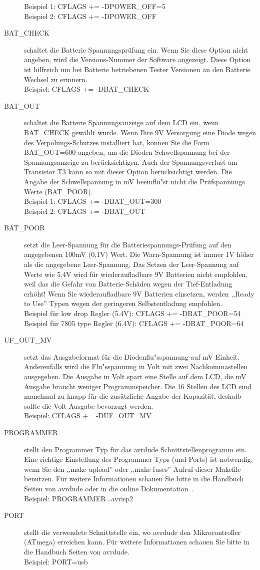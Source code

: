 \begin{description}
Beispiel 1: CFLAGS += -DPOWER\_OFF=5 \\
Beispiel 2: CFLAGS += -DPOWER\_OFF 
  \item[BAT\_CHECK] schaltet die Batterie Spannungspr\"ufung ein.
 Wenn Sie diese Option nicht angeben, wird die Versions-Nummer der Software angezeigt.
Diese Option ist hilfreich um bei Batterie betriebenen Tester Versionen an den Batterie Wechsel zu erinnern.\\
Beispiel: CFLAGS += -DBAT\_CHECK
  \item[BAT\_OUT] schaltet die Batterie Spannungsanzeige auf dem LCD ein, wenn BAT\_CHECK gew\"ahlt wurde.
 Wenn Ihre 9V Versorgung eine Diode wegen des Verpolungs-Schutzes installiert hat, k\"onnen Sie 
die Form BAT\_OUT=600 angeben, um die Dioden-Schwellspannung 
bei der Spannungsanzeige zu ber\"ucksichtigen.
Auch der Spannungsverlust am Transistor T3 kann so mit dieser Option ber\"ucksichtigt werden.
Die Angabe der Schwellspannung in mV beeinflu"st nicht die Pr\"uf\-span\-nungs Werte (BAT\_POOR).\\
Beispiel 1: CFLAGS += -DBAT\_OUT=300 \\
Beispiel 2: CFLAGS += -DBAT\_OUT
  \item[BAT\_POOR] setzt die Leer-Spannung f\"ur die Batteriespannungs-Pr\"ufung auf den angegebenen 100mV (0,1V) Wert.
Die Warn-Spannung ist immer 1V h\"oher als die angegebene Leer-Spannung.
Das Setzen der Leer-Spannung auf Werte wie 5,4V wird f\"ur wiederaufladbare 9V Batterien nicht empfohlen,
weil das die Gefahr von Batterie-Sch\"aden wegen der Tief-Entladung erh\"oht!
Wenn Sie wiederaufladbare 9V Batterien einsetzen, werden ,,Ready to Use'' Typen wegen der geringeren Selbstentladung empfohlen.\\
Beispiel f\"ur low drop Regler (5.4V): CFLAGS += -DBAT\_POOR=54 \\
Beispiel f\"ur 7805 type Regler (6.4V): CFLAGS += -DBAT\_POOR=64
  \item[UF\_OUT\_MV] setzt das Ausgabeformat f\"ur die Diodenflu"sspannung auf mV Einheit.
Anderenfalls wird die Flu"sspannung in Volt mit zwei Nachkommastellen ausgegeben.
Die Ausgabe in Volt spart eine Stelle auf dem LCD, die mV Ausgabe braucht weniger Programmspeicher.
Die 16 Stellen des LCD sind manchmal zu knapp f\"ur die zus\"atzliche Angabe der Kapazit\"at, deshalb sollte die Volt Ausgabe bevorzugt werden.\\
Beispiel: CFLAGS += -DUF\_OUT\_MV
  \item[PROGRAMMER] stellt den Programmer Typ f\"ur das avrdude Schnittstellenprogramm ein.
Eine richtige Einstellung des Programmer Typs (und Ports) ist notwendig, wenn Sie den ,,make upload'' oder
,,make fuses'' Aufruf dieser Makefile benutzen.
F\"ur weitere Informationen schauen Sie bitte in die Handbuch Seiten von avrdude oder in die online Dokumentation~\cite{avrdude}.\\
Beispiel: PROGRAMMER=avrisp2
  \item[PORT] stellt die verwendete Schnittstelle ein, wo avrdude den Mikrocontroller (ATmega) erreichen kann.
F\"ur weitere Informationen schauen Sie bitte in die Handbuch Seiten von avrdude.\\
Beispiel: PORT=usb


\end{description}
